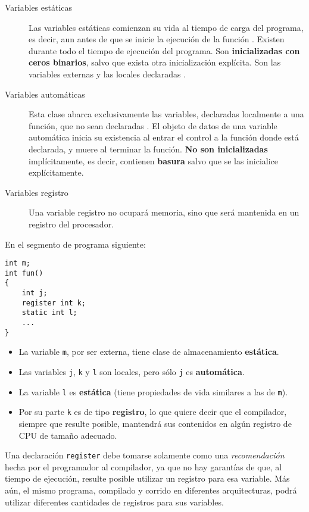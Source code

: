 \begin{description}
	\item[Variables estáticas] Las variables estáticas comienzan su vida al tiempo de carga del programa, es decir, aun antes de que
se inicie la ejecución de la función . Existen durante todo el tiempo de ejecución del programa.
Son \textbf{inicializadas con ceros binarios}, salvo que exista otra inicialización explícita. Son las variables
externas y las locales declaradas .
 \item [Variables automáticas] Esta clase abarca exclusivamente las variables, declaradas localmente a una función, que no sean
declaradas . El objeto de datos de una variable automática inicia su existencia al entrar el control a la función donde
está declarada, y muere al terminar la función. \textbf{No son inicializadas} implícitamente, es decir, contienen
\textbf{basura} salvo que se las inicialice explícitamente.
\item [Variables registro] Una variable registro no ocupará memoria, sino que será mantenida en un registro del procesador.
\end{description}

\begin{ejemplo}
En el segmento de programa siguiente:
\begin{lstlisting}
int m;
int fun()
{
	int j;
	register int k;
	static int l;
	...
}
\end{lstlisting}
\begin{itemize}
	\item La variable \lstinline{m}, por ser externa, tiene clase de almacenamiento \textbf{estática}. 
	\item Las variables \lstinline{j}, \lstinline{k} y \lstinline{l} son locales, pero sólo \lstinline{j} es \textbf{automática}. 
	\item La variable \lstinline{l} es \textbf{estática} (tiene propiedades de vida similares a las de \lstinline{m}). 
		\item Por su parte \lstinline{k} es de tipo \textbf{registro}, lo que quiere decir que el compilador, siempre que resulte posible, mantendrá sus contenidos en algún registro de CPU de tamaño adecuado. 
\end{itemize}
\end{ejemplo}


Una declaración \lstinline{register} debe tomarse solamente como una \textit{recomendación} hecha por el programador al compilador, ya que no hay garantías de que, al tiempo de ejecución, resulte posible utilizar un registro para esa variable. Más aún, el mismo programa, compilado y corrido en diferentes arquitecturas, podrá utilizar diferentes cantidades de registros para sus variables.

